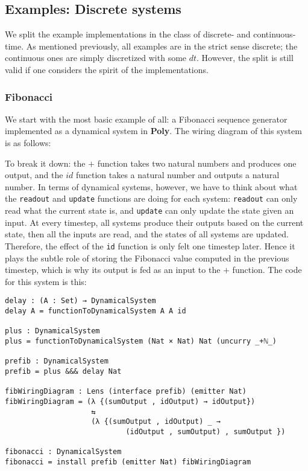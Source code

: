 \subsection{Examples: Discrete systems}

We split the example implementations in the class of discrete- and continuous-time. As mentioned previously, all examples are in the strict sense discrete; the continuous ones are simply discretized with some $dt$. However, the split is still valid if one considers the spirit of the implementations.

\subsubsection{Fibonacci}
We start with the most basic example of all: a Fibonacci sequence generator implemented as a dynamical system in \textbf{Poly}. The wiring diagram of this system is as follows:

To break it down: the $+$ function takes two natural numbers and produces one output, and the $id$ function takes a natural number and outputs a natural number. In terms of dynamical systems, however, we have to think about what the \texttt{readout} and \texttt{update} functions are doing for each system: \texttt{readout} can only read what the current state is, and \texttt{update} can only update the state given an input. At every timestep, all systems produce their outputs based on the current state, then all the inputs are read, and the states of all systems are updated. Therefore, the effect of the \texttt{id} function is only felt one timestep later. Hence it plays the subtle role of storing the Fibonacci value computed in the previous timestep, which is why its output is fed as an input to the $+$ function. The code for this system is this:

\begin{verbatim}
delay : (A : Set) → DynamicalSystem
delay A = functionToDynamicalSystem A A id

plus : DynamicalSystem
plus = functionToDynamicalSystem (Nat × Nat) Nat (uncurry _+ℕ_)

prefib : DynamicalSystem
prefib = plus &&& delay Nat

fibWiringDiagram : Lens (interface prefib) (emitter Nat)
fibWiringDiagram = (λ {(sumOutput , idOutput) → idOutput})
                    ⇆ 
                    (λ {(sumOutput , idOutput) _ → 
                            (idOutput , sumOutput) , sumOutput })

fibonacci : DynamicalSystem
fibonacci = install prefib (emitter Nat) fibWiringDiagram
\end{verbatim}

